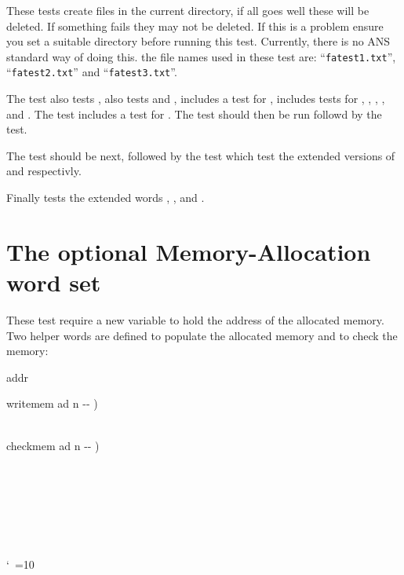 \cbstart{}
These tests create files in the current directory, if all goes well
these will be deleted.  If something fails they may not be deleted.
If this is a problem ensure you set a suitable directory before
running this test.  Currently, there is no ANS standard way of doing
this.  the file names used in these test are:
``\texttt{fatest1.txt}'', ``\texttt{fatest2.txt}'' and
``\texttt{fatest3.txt}''.

The test  also tests ,
 also tests  and ,
 includes a test for ,
 includes tests for ,
, , , and
.
The  test includes a test for .
The test  should then be run followd by
the  test.

The  test should be next, followed by
 the test which test the extended versions of
 and  respectivly.

Finally  tests the extended words
, , and .

\cbend
{}




\section{The optional Memory-Allocation word set} %

\cbstart{}
These test require a new variable to hold the address of the allocated
memory.  Two helper words are defined to populate the allocated memory
and to check the memory:

\begin{tt}\frenchspacing\obeyspaces
{} addr

\word{:} writemem  ad n -{}- ) \\
         \\
\word{;}

\word{:} checkmem  ad n -{}- ) \\
  \\
\tab[2]     \\
\tab[2]  \\
\tab[2]   \\
\tab {} \\
\tab {} \\
\word{;}
\end{tt}
\nonfrenchspacing\catcode`\ =10

